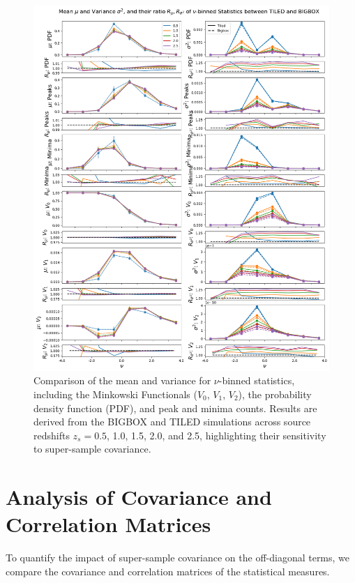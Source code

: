 \begin{figure}[p]
    \centering
    \includegraphics[width=\textwidth]{figures/results/nu_main.png}
    \caption[Comparison of Mean and Variance for Non-Correlation Statistics]
    {Comparison of the mean and variance for $\nu$-binned statistics, including the Minkowski Functionals ($V_0$, $V_1$, $V_2$), the probability density function (PDF), and peak and minima counts. Results are derived from the BIGBOX and TILED simulations across source redshifts $z_s = 0.5$, 1.0, 1.5, 2.0, and 2.5, highlighting their sensitivity to super-sample covariance.}
    \label{fig:nu_main}
\end{figure}

\clearpage

\section{Analysis of Covariance and Correlation Matrices}
To quantify the impact of super-sample covariance on the off-diagonal terms, we compare the covariance and correlation matrices of the statistical measures.

